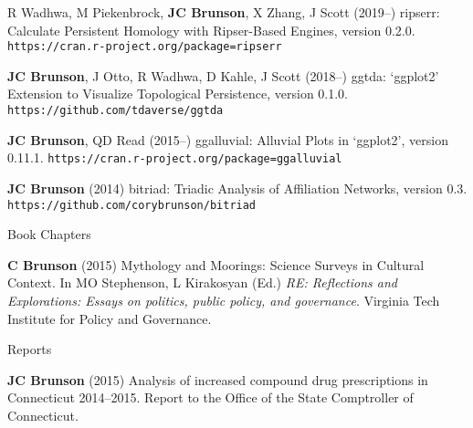 \documentclass[10pt,a4paper]{article}
\begin{document}
\begin{enumerate}[label={[\arabic*]},labelindent=1cm,nolistsep]
R Wadhwa, M Piekenbrock, {\bfseries JC Brunson}, X Zhang, J Scott (2019--) {\sffamily ripserr}: Calculate Persistent Homology with Ripser-Based Engines, version 0.2.0. {\tt\small\nolinkurl{https://cran.r-project.org/package=ripserr}}
\item
{\bfseries JC Brunson}, J Otto, R Wadhwa, D Kahle, J Scott (2018--) {\sffamily ggtda}: `ggplot2' Extension to Visualize Topological Persistence, version 0.1.0. {\tt\small\nolinkurl{https://github.com/tdaverse/ggtda}}
\item
{\bfseries JC Brunson}, QD Read (2015--) {\sffamily ggalluvial}: Alluvial Plots in `ggplot2', version 0.11.1. {\tt\small\nolinkurl{https://cran.r-project.org/package=ggalluvial}}
\item
{\bfseries JC Brunson} (2014) {\sffamily bitriad}: Triadic Analysis of Affiliation Networks, version 0.3. {\tt\small\nolinkurl{https://github.com/corybrunson/bitriad}}
\setcounter{paper}{\value{enumi}}
\end{enumerate}
%
\vspace{.25cm}
{\sc Book Chapters}
\begin{enumerate}[label={[\arabic*]},labelindent=1cm,nolistsep]
\item
{\bfseries C Brunson} (2015) Mythology and Moorings: Science Surveys in Cultural Context. In MO Stephenson, L Kirakosyan (Ed.) {\itshape RE: Reflections and Explorations: Essays on politics, public policy, and governance}. Virginia Tech Institute for Policy and Governance.
\setcounter{paper}{\value{enumi}}
\end{enumerate}
%
\vspace{.25cm}
{\sc Reports}
\begin{enumerate}[label={[\arabic*]},labelindent=1cm,nolistsep]
\item
{\bfseries JC Brunson} (2015) Analysis of increased compound drug prescriptions in Connecticut 2014--2015. Report to the Office of the State Comptroller of Connecticut.
\setcounter{paper}{\value{enumi}}
\end{enumerate}

\end{document}
